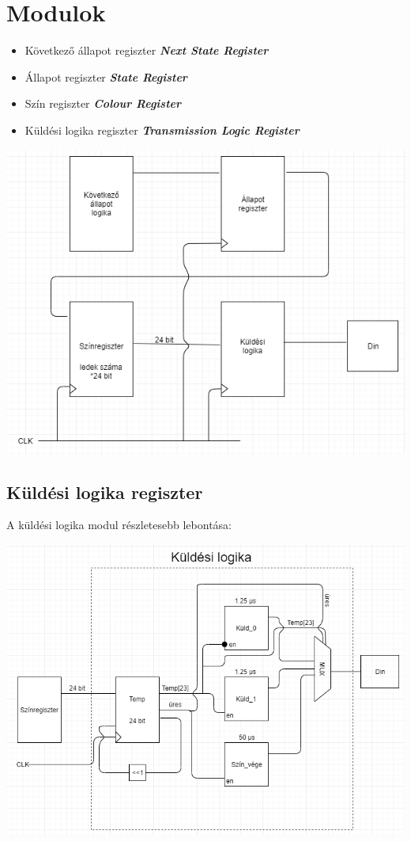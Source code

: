 \documentclass[10pt]{article} %
\begin{document}
\section{Modulok}

\begin{itemize}
\item Következő állapot regiszter \textbf{\textit{Next State Register}}
\item Állapot regiszter \textbf{\textit{State Register}}
\item Szín regiszter \textbf{\textit{Colour Register}}
\item Küldési logika regiszter \textbf{\textit{Transmission Logic Register}}
\end{itemize}

\includegraphics[scale=0.5]{tombvazlat.png}

\subsection{Küldési logika regiszter}

\noindent A küldési logika modul részletesebb lebontása: 

\includegraphics[scale=0.6]{kuldesi_logika.png}
\end{document}

